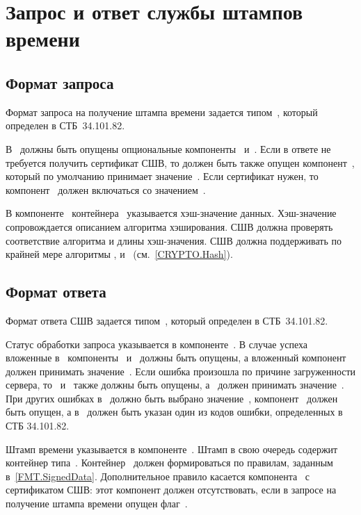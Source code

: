 \section{Запрос и ответ службы штампов времени}\label{FMT.TSP}

\subsection{Формат запроса}\label{FMT.TSP.Req}

Формат запроса на получение штампа времени задается типом~,
который определен в СТБ~34.101.82.

В~ должны быть опущены опциональные 
компоненты~ и~.
%
Если в ответе не требуется получить сертификат СШВ, то должен быть также опущен
компонент~, который по умолчанию принимает значение~.
%
Если сертификат нужен, то компонент~ должен включаться со
значением~.

В компоненте~ контейнера~ указывается
хэш-значение данных. Хэш-значение сопровождается описанием алгоритма
хэширования. СШВ должна проверять соответствие алгоритма и длины хэш-значения.
СШВ должна поддерживать по крайней мере алгоритмы ,
 и~ (см.~\ref{CRYPTO.Hash}).

\subsection{Формат ответа}\label{FMT.TSP.Resp}
 
Формат ответа СШВ задается типом~, который определен 
в СТБ~34.101.82. 

Статус обработки запроса указывается в компоненте~.
%
В случае успеха вложенные в~ компоненты~
и~ должны быть опущены, а вложенный компонент~
должен принимать значение~.
%
Если ошибка произошла по причине загруженности сервера, то~
и~ также должны быть опущены, а~ должен принимать
значение~.
%
При других ошибках в~ должно быть выбрано
значение~, компонент~ должен быть опущен, а
в~ должен быть указан один из кодов ошибки, определенных в СТБ
34.101.82.

Штамп времени указывается в компоненте~. Штамп в свою
очередь содержит контейнер типа~.
%
Контейнер~ должен формироваться по правилам, заданным
в~\ref{FMT.SignedData}. Дополнительное правило  касается
компонента~ с сертификатом СШВ: этот компонент должен
отсутствовать, если в запросе на получение штампа времени опущен
флаг~.

